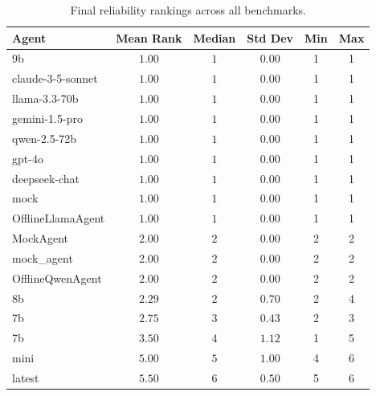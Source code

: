 \begin{table}[t]
\centering
\caption{Final reliability rankings across all benchmarks.}
\label{tab:rankings}
\begin{tabular}{lccccc}
\toprule
Agent & Mean Rank & Median & Std Dev & Min & Max \\
\midrule
9b & $1.00$ & $1$ & $0.00$ & 1 & 1 \\
claude-3-5-sonnet & $1.00$ & $1$ & $0.00$ & 1 & 1 \\
llama-3.3-70b & $1.00$ & $1$ & $0.00$ & 1 & 1 \\
gemini-1.5-pro & $1.00$ & $1$ & $0.00$ & 1 & 1 \\
qwen-2.5-72b & $1.00$ & $1$ & $0.00$ & 1 & 1 \\
gpt-4o & $1.00$ & $1$ & $0.00$ & 1 & 1 \\
deepseek-chat & $1.00$ & $1$ & $0.00$ & 1 & 1 \\
mock & $1.00$ & $1$ & $0.00$ & 1 & 1 \\
OfflineLlamaAgent & $1.00$ & $1$ & $0.00$ & 1 & 1 \\
MockAgent & $2.00$ & $2$ & $0.00$ & 2 & 2 \\
mock_agent & $2.00$ & $2$ & $0.00$ & 2 & 2 \\
OfflineQwenAgent & $2.00$ & $2$ & $0.00$ & 2 & 2 \\
8b & $2.29$ & $2$ & $0.70$ & 2 & 4 \\
7b & $2.75$ & $3$ & $0.43$ & 2 & 3 \\
7b & $3.50$ & $4$ & $1.12$ & 1 & 5 \\
mini & $5.00$ & $5$ & $1.00$ & 4 & 6 \\
latest & $5.50$ & $6$ & $0.50$ & 5 & 6 \\
\bottomrule
\end{tabular}
\end{table}
